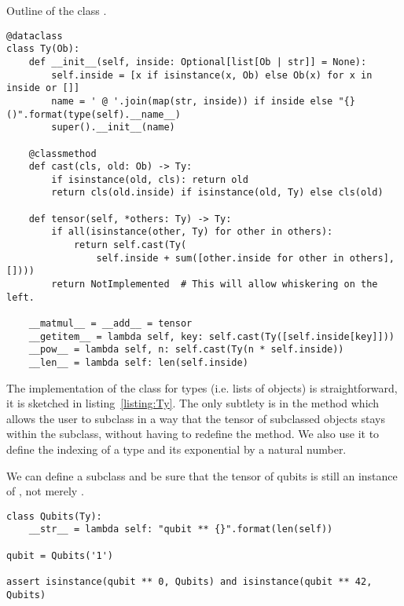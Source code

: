 \begin{python}\label{listing:Ty}
{\normalfont Outline of the class .}
\begin{verbatim}
@dataclass
class Ty(Ob):
    def __init__(self, inside: Optional[list[Ob | str]] = None):
        self.inside = [x if isinstance(x, Ob) else Ob(x) for x in inside or []]
        name = ' @ '.join(map(str, inside)) if inside else "{}()".format(type(self).__name__)
        super().__init__(name)

    @classmethod
    def cast(cls, old: Ob) -> Ty:
        if isinstance(old, cls): return old
        return cls(old.inside) if isinstance(old, Ty) else cls(old)

    def tensor(self, *others: Ty) -> Ty:
        if all(isinstance(other, Ty) for other in others):
            return self.cast(Ty(
                self.inside + sum([other.inside for other in others], [])))
        return NotImplemented  # This will allow whiskering on the left.

    __matmul__ = __add__ = tensor
    __getitem__ = lambda self, key: self.cast(Ty([self.inside[key]]))
    __pow__ = lambda self, n: self.cast(Ty(n * self.inside))
    __len__ = lambda self: len(self.inside)
\end{verbatim}
\end{python}

The implementation of the class  for types (i.e. lists of objects) is straightforward, it is sketched in listing~\ref{listing:Ty}.
The only subtlety is in the method  which allows the user to subclass  in a way that the tensor of subclassed objects stays within the subclass, without having to redefine the  method.
We also use it to define the indexing of a type and its exponential by a natural number.

\begin{example}
We can define a  subclass and be sure that the tensor of qubits is still an instance of , not merely .

\begin{verbatim}
class Qubits(Ty):
    __str__ = lambda self: "qubit ** {}".format(len(self))

qubit = Qubits('1')

assert isinstance(qubit ** 0, Qubits) and isinstance(qubit ** 42, Qubits)
\end{verbatim}
\end{example}

